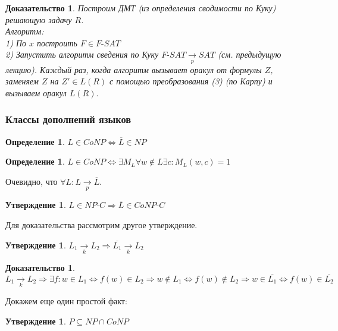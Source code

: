\documentclass{beamer}
\theoremstyle{plain}
\newtheorem{state}[thm]{Утверждение}
\newtheorem{proof-rus}[thm]{Доказательство}
\newtheorem{dfn}[thm]{Определение}
\theoremstyle{definition}
\begin{document}
\begin{frame}
    \begin{proof-rus}
        Построим ДМТ (из определения сводимости по Куку) решающую задачу $R$. \\
        Алгоритм: \\
        1) По $x$ построить $F \in F\text{-}SAT$ \\
        2) Запустить алгоритм сведения по Куку $F\text{-}SAT \xrightarrow[p]{} SAT$ (см. предыдущую лекцию). Каждый раз, когда алгоритм вызывает оракул от формулы $Z$, заменяем $Z$ на $Z' \in L(R)$ с помощью преобразования (3) (по Карпу) и вызываем оракул $L(R).$
    \end{proof-rus}
\end{frame}

\begin{frame}
    \frametitle{Классы дополнений языков}
    \begin{dfn}
        $L \in CoNP \Leftrightarrow \overline{L} \in NP$
    \end{dfn}
    \begin{dfn}
        $L \in CoNP \Leftrightarrow \exists M_L \forall w \notin L \exists c : M_L(w,c) = 1$
    \end{dfn}
    Очевидно, что $\forall L : L \xrightarrow[p]{} \overline{L}$.
    \begin{state}
        $L \in NP\text{-}C \Rightarrow \overline{L} \in CoNP\text{-}C$
    \end{state}
    Для доказательства рассмотрим другое утверждение.
\end{frame}

\begin{frame}
    \begin{state}
        $L_1 \xrightarrow[k]{} L_2 \Rightarrow \overline{L_1} \xrightarrow[k]{} L_2$
    \end{state}
    \begin{proof-rus}
        $L_1 \xrightarrow[k]{} L_2 \Rightarrow \exists f : w \in L_1 \Leftrightarrow f(w) \in L_2 \Rightarrow w \notin L_1 \Leftrightarrow f(w) \notin L_2 \Rightarrow w \in \overline{L_1} \Leftrightarrow f(w) \in \overline{L_2}$
    \end{proof-rus}
    Докажем еще один простой факт:
    \begin{state}
        $P \subseteq NP \cap CoNP$
    \end{state}
\end{frame}
\end{document}
